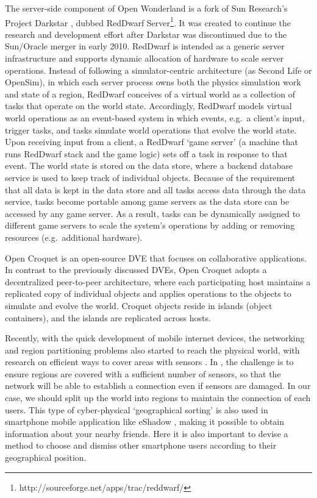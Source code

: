 \documentclass[]{elsarticle}
\begin{document}
The server-side component of Open Wonderland is a fork of Sun Research's Project Darkstar \cite{Waldo.2008}, dubbed RedDwarf Server\footnote{http://sourceforge.net/apps/trac/reddwarf/}. It was created to continue the research and development effort after Darkstar was discontinued due to the Sun/Oracle merger in early 2010. RedDwarf is intended as a generic server infrastructure and supports dynamic allocation of hardware to scale server operations. Instead of following a simulator-centric architecture (as Second Life or OpenSim), in which each server process owns both the physics simulation work and state of a region, RedDwarf conceives of a virtual world as a collection of tasks that operate on the world state. Accordingly, RedDwarf models virtual world operations as an event-based system in which events, e.g.~a client's input, trigger tasks, and tasks simulate world operations that evolve the world state. Upon receiving input from a client, a RedDwarf `game server' (a machine that runs RedDwarf stack and the game logic) sets off a task in response to that event. The world state is stored on the data store, where a backend database service is used to keep track of individual objects. Because of the requirement that all data is kept in the data store and all tasks access data through the data service, tasks become portable among game servers as the data store can be accessed by any game server. As a result, tasks can be dynamically assigned to different game servers to scale the system's operations by adding or removing resources (e.g.~additional hardware).

Open Croquet \cite{Smith+others.2003} is an open-source DVE that focuses on collaborative applications. In contrast to the previously discussed DVEs, Open Croquet adopts a decentralized peer-to-peer architecture, where each participating host maintains a replicated copy of individual objects and applies operations to the objects to simulate and evolve the world. Croquet objects reside in islands (object containers), and the islands are replicated across hosts.

Recently, with the quick development of mobile internet devices, the networking and region partitioning problems also  started to reach the physical world, with research on efficient ways to cover areas with sensors \cite{Yu2012}. In \cite{Shibo2012}, the challenge is to ensure regions are covered with a sufficient number of sensors, so that the network will be able to establish a connection even if sensors are damaged. In our case, we should split up the world into regions to maintain the connection of each users. This type of cyber-physical `geographical sorting' is also used in smartphone mobile application like eShadow \cite{J.Teng+B.Thang+others.2011}, making it possible to obtain information about your nearby friends. Here it is also important to devise a method to choose and dismiss other smartphone users according to their geographical position.
\end{document}
